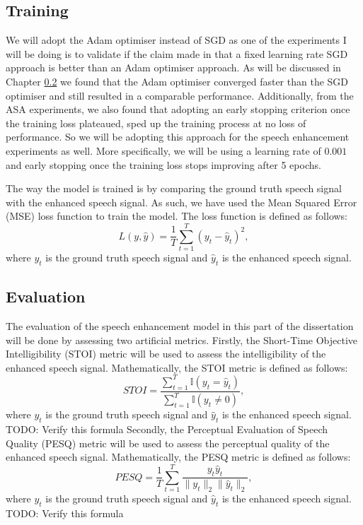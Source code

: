 \documentclass[logo,bsc,singlespacing,parskip,online]{infthesis}
\begin{document}
\subsection{Training}
We will adopt the Adam optimiser instead of SGD as one of the experiments I will be doing 
is to validate if the claim made in \citet{Huwel2020HearDS} that a fixed learning rate SGD approach
is better than an Adam optimiser approach. As will be discussed in Chapter \ref{} 
we found that the Adam optimiser converged faster than the SGD optimiser and still resulted in a comparable 
performance. Additionally, from the ASA experiments, we also found that adopting an early stopping criterion 
once the training loss plateaued, sped up the training process at no loss of performance. So we will be adopting 
this approach for the speech enhancement experiments as well. More specifically, we will be using a learning rate of $0.001$
and early stopping once the training loss stops improving after 5 epochs.

The way the model is trained is by comparing the ground truth speech signal with the enhanced speech signal. 
As such, we have used the Mean Squared Error (MSE) loss function to train the model. The loss function is defined as follows:
\[
L(y, \hat{y}) = \frac{1}{T} \sum_{t=1}^{T} (y_t - \hat{y}_t)^2,
\]
where \(y_t\) is the ground truth speech signal and \(\hat{y}_t\) is the enhanced speech signal.

\subsection{Evaluation}
The evaluation of the speech enhancement model in this part of the dissertation will be 
done by assessing two artificial metrics.
Firstly, the Short-Time Objective Intelligibility (STOI) metric will be used to assess the intelligibility of the enhanced speech signal.
Mathematically, the STOI metric is defined as follows:
\[
STOI = \frac{\sum_{t=1}^{T} \mathbb{I}(y_t = \hat{y}_t)}{\sum_{t=1}^{T} \mathbb{I}(y_t \neq 0)},
\]
where \(y_t\) is the ground truth speech signal and \(\hat{y}_t\) is the enhanced speech signal.
TODO: Verify this formula
Secondly, the Perceptual Evaluation of Speech Quality (PESQ) metric will be used to assess the perceptual quality of the enhanced speech signal.
Mathematically, the PESQ metric is defined as follows:
\[
PESQ = \frac{1}{T} \sum_{t=1}^{T} \frac{y_t \hat{y}_t}{\|y_t\|_2 \|\hat{y}_t\|_2},
\]
where \(y_t\) is the ground truth speech signal and \(\hat{y}_t\) is the enhanced speech signal.
TODO: Verify this formula
\end{document}
